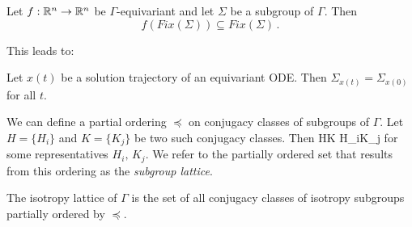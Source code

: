 \begin{theorem}
 Let $f:\mathbb{R}^{n}\rightarrow\mathbb{R}^{n}$ be $\Gamma$-equivariant and let $\Sigma$ be a subgroup of $\Gamma$. Then
\[
 f\left(Fix(\Sigma)\right)\subseteq Fix(\Sigma)\,.
\]
\end{theorem}

This leads to: 
\begin{proposition}
 Let $x(t)$ be a solution trajectory of an equivariant ODE. Then $\Sigma_{x(t)}=\Sigma_{x(0)}$ for all $t$.
\end{proposition}

We can define a partial ordering $\preceq$ on conjugacy classes of subgroups of $\Gamma$. Let $H=\{H_i\}$ and $K=\{K_j\}$
be two such conjugacy classes. Then
\beq
	H\preceq K \Leftrightarrow H_i\subseteq K_j
	\label{eq:Gorder}
\eeq
for some representatives $H_i,\,K_j$. We refer to the partially ordered set that results from this ordering as the \emph{subgroup lattice}.

\begin{definition}
 The isotropy lattice of $\Gamma$ is the set of all conjugacy classes of isotropy subgroups 
 partially ordered by $\preceq$.
\end{definition}

